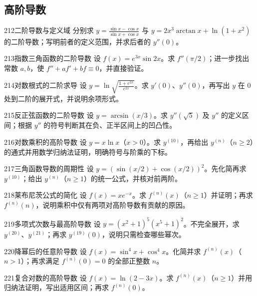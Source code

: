 \subsection{高阶导数}
\begin{exercise}{212}{二阶导数与定义域}
分别求 $y=\frac{\sin x-\cos x}{\sin x+\cos x}$ 与 $y=2x^3\arctan x+\ln(1+x^2)$ 的二阶导数；写明前者的定义范围，并求后者的 $y''(0)$。
\end{exercise}
\begin{exercise}{213}{指数三角函数的二阶导数}
设 $f(x)=e^{3x}\sin2x$。求 $f''(\pi/2)$；进一步找出常数 $a,b$，使 $f''+af'+bf\equiv0$，并直接验证。
\end{exercise}
\begin{exercise}{214}{对数根式的二阶求导}
设 $y=\ln\sqrt{\frac{1+e^{2x}}{e^{2x}}}$。求 $y'(0)$、$y''(0)$，再写出 $y$ 在 $0$ 处到二阶的展开式，并说明余项形式。
\end{exercise}
\begin{exercise}{215}{反正弦函数的二阶导数}
设 $y=\arcsin(x/3)$。求 $y''(\sqrt5)$ 及 $y''$ 的定义区间；根据 $y''$ 的符号判断其在负、正半区间上的凹凸性。
\end{exercise}
\begin{exercise}{216}{对数乘积的高阶导数}
设 $y=x\ln x$（$x>0$）。求 $y^{(10)}$，再给出 $y^{(n)}$（$n\ge2$）的通式并用数学归纳法证明，明确符号与阶乘的下标。
\end{exercise}
\begin{exercise}{217}{三角函数导数的周期性}
设 $y=(\sin(x/2)+\cos(x/2))^2$。先化简再求 $y^{(10)}$；给出 $y^{(n)}$（$n\ge1$）的统一公式，并核对前两阶。
\end{exercise}
\begin{exercise}{218}{莱布尼茨公式的简化}
设 $f(x)=xe^{-x}$。求 $f^{(n)}(x)$（$n\ge1$）并证明；再求 $f^{(n)}(n)$，说明乘积中仅有两项对高阶导数有贡献的原因。
\end{exercise}
\begin{exercise}{219}{多项式次数与最高阶导数}
设 $y=(x^2+1)^5(x^5+1)^2$。不完全展开，求 $y^{(20)}$、$y^{(21)}$；再求 $y^{(19)}(0)$，说明只需检查哪些幂次。
\end{exercise}
\begin{exercise}{220}{降幂后的任意阶导数}
设 $f(x)=\sin^4x+\cos^4x$。化简并求 $f^{(n)}(x)$（$n>1$）；再求满足 $f^{(n)}(0)=0$ 的全部正整数 $n$。
\end{exercise}
\begin{exercise}{221}{复合对数的高阶导数}
设 $f(x)=\ln(2-3x)$。求 $f^{(n)}(x)$（$n\ge1$）并用归纳法证明，写出适用区间；再求 $f^{(n)}(0)$。
\end{exercise}
